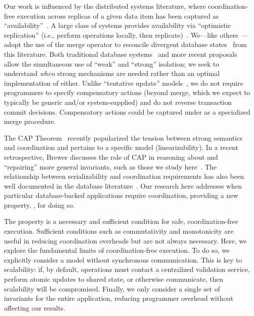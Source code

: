  Our work is
influenced by the distributed systems literature, where
coordination-free execution across replicas of a given data item has
been captured as ``availability''~\cite{gilbert-cap,queue}. A large
class of systems provides availability via ``optimistic replication''
(i.e., perform operations locally, then
replicate)~\cite{optimistic}. We---like others~\cite{ec-txns}---adopt
the use of the merge operator to reconcile divergent database
states~\cite{bayou} from this literature. Both traditional database
systems~\cite{adya} and more recent
proposals~\cite{redblue-new, redblue} allow the simultaneous use of
``weak'' and ``strong'' isolation; we seek to understand \textit{when}
strong mechanisms are needed rather than an optimal implementation of
either. Unlike ``tentative update'' models~\cite{sagas}, we do not
require programmers to specify compensatory actions (beyond merge,
which we expect to typically be generic and/or system-supplied) and do
not reverse transaction commit decisions. Compensatory actions could
be captured under \iconfluence as a specialized merge procedure.

The CAP Theorem~\cite{gilbert-cap,pacelc} recently popularized the
tension between strong semantics and coordination and pertains to a
specific model (linearizability). In a recent retrospective, Brewer
discusses the role of CAP in reasoning about and ``repairing'' more
general invariants, such as those we study
here~\cite{brewer-cap}. The relationship between serializability and
coordination requirements has also been well documented in the
database literature~\cite{davidson-survey}. Our research here
addresses when particular database-backed applications require
coordination, providing a new property, \iconfluence, for doing so.

 The \iconfluence property is a necessary and
sufficient condition for safe, coordination-free execution. Sufficient
conditions such as commutativity and monotonicity are useful in
reducing coordination overheads but are not always necessary. Here, we
explore the fundamental limits of coordination-free execution. To do
so, we explicitly consider a model without synchronous
communication. This is key to scalability: if, by default, operations
must contact a centralized validation service, perform atomic updates
to shared state, or otherwise communicate, then scalability will be
compromised. Finally, we only consider a single set of invariants for
the entire application, reducing programmer overhead without affecting
our \iconfluence results.



